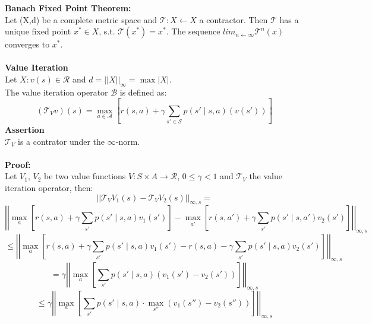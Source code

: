 \textbf{Banach Fixed Point Theorem:}\\
Let (X,d) be a complete metric space and $\mathcal{T}:X \leftarrow X$ a contractor. 
Then $\mathcal{T}$ has a unique fixed point $x^* \in X$, s.t. $\mathcal{T}(x^*) = x^*$. The sequence $lim_{n \leftarrow \infty}\mathcal{T}^n(x)$ converges to $x^*$.\\ \\

\textbf{Value Iteration}\\
Let $X : v(s) \in \mathcal{R}$ and $d = ||X||_{\infty} = \max|X|$. \\
The value iteration operator $\mathcal{B}$ is defined as:
\begin{equation}
    (\mathcal{T}_{V}v)(s) = \max_{a \in \mathcal{A}} \left[  r(s,a) +  \gamma \sum_{s' \in \mathcal{S}} p(s' \mid s,a) \left( v(s')\right) \right]
\end{equation}
\textbf{Assertion}\\

$\mathcal{T}_{V}$ is a contrator under the $\infty$-norm.\\ \\

\textbf{Proof:}\\
Let $V_1$, $V_2$ be two value functions $V : S \times A \to \mathcal{R}$, $0 \leq \gamma < 1$ and $\mathcal{T}_{V}$ the value iteration operator, then:
\begin{equation}
    \label{contractor}
||\mathcal{T}_{V}V_1(s) - \mathcal{T}_{V}V_2(s)||_{\infty, s} = 
\end{equation}
\begin{equation}
    \left|\left| \max_a \left[ r(s,a) + \gamma \sum_{s'} p(s' \mid s,a) v_1(s')\right] - \max_{a'}\left[ r(s,a') + \gamma \sum_{s'} p(s' \mid s,a') v_2(s') \right] \right|\right|_{\infty, s}
\end{equation}
\begin{equation}
    \leq \left|\left|\max_a \left[ r(s,a) + \gamma \sum_{s'} p(s' \mid s,a) v_1(s') - r(s,a) - \gamma \sum_{s'} p(s' \mid s,a) v_2(s')\right]\right|\right|_{\infty, s}
\end{equation}
\begin{equation}
= \gamma \left|\left|\max_a \left[ \sum_{s'} p(s' \mid s,a) (v_1(s') -v_2(s'))\right]\right|\right|_{\infty, s}
\end{equation}
\begin{equation}
\leq \gamma \left|\left|\max_a \left[ \sum_{s'} p(s' \mid s,a) \cdot \max_{s''} (v_1(s'') -v_2(s''))\right]\right|\right|_{\infty, s}
\end{equation}

